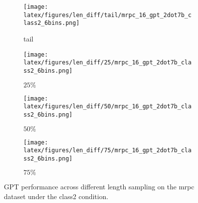 \begin{figure*}
    \centering
    \begin{minipage}[t]{\linewidth}
        \begin{subfigure}{0.245\linewidth}
            \centering
            \texttt{[image: latex/figures/len\_diff/tail/mrpc\_16\_gpt\_2dot7b\_class2\_6bins.png]}
            \caption{tail}\label{fig:image1}
        \end{subfigure}%
        \hfill
        \begin{subfigure}{0.245\linewidth}
            \centering
            \texttt{[image: latex/figures/len\_diff/25/mrpc\_16\_gpt\_2dot7b\_class2\_6bins.png]}
            \caption{$25\%$}\label{fig:image2}
        \end{subfigure}
        \hfill
        \begin{subfigure}{0.245\linewidth}
            \centering
            \texttt{[image: latex/figures/len\_diff/50/mrpc\_16\_gpt\_2dot7b\_class2\_6bins.png]}
            \caption{$50\%$}\label{fig:image3}
        \end{subfigure}
        \begin{subfigure}{0.245\linewidth}
            \centering
            \texttt{[image: latex/figures/len\_diff/75/mrpc\_16\_gpt\_2dot7b\_class2\_6bins.png]}
            \caption{$75\%$}\label{fig:image4}
        \end{subfigure}%
    \end{minipage}%
    \hfill
    \begin{minipage}[c]{\linewidth}
        \caption{\label{fig:gpt-len-qnli}GPT performance across different length sampling on the mrpc dataset under the class2 condition.}
    \end{minipage}
\end{figure*}